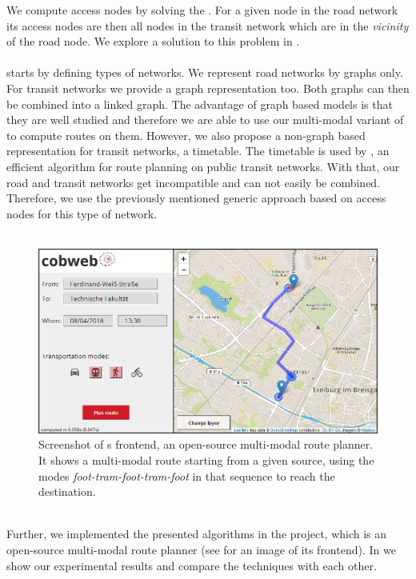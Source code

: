	We compute access nodes by solving the \nearestNeighborProblem. For a given node in the road network its access
	nodes are then all nodes in the transit network which are in the \textit{vicinity} of the road node. We explore a solution
	to this problem in .\\\\
	 starts by defining types of networks. We represent road networks by graphs only.
	For transit networks we provide a graph representation too. Both graphs can then be combined into a linked graph.
	The advantage of graph based models is that they are well studied and therefore we are able to use our
	multi-modal variant of \dijkstra to compute routes on them.
	However, we also propose a non-graph based representation for transit networks, a timetable. The timetable is used by \csa,
	an efficient algorithm for route planning on public transit networks. With that, our road and transit networks get incompatible
	and can not easily be combined. Therefore, we use the previously mentioned generic approach based on access nodes
	for this type of network.\\\\
	\begin{figure}[!ht]
		 \begin{center}
			\includegraphics[scale=0.5]{res/cobweb_frontend}
		\end{center}
		\caption{Screenshot of {\cobweb}s  frontend, an open-source multi-modal route planner. It shows a multi-modal
		route starting from a given source, using the modes \textit{foot-tram-foot-tram-foot} in that sequence to reach the destination.}
		\label{cobweb_frontend}
	\end{figure}\quad\\
	Further, we implemented the presented algorithms in the \cobweb {} project, which is an open-source multi-modal
	route planner (see  for an image of its frontend).
	In  we show our experimental results and compare the techniques with each other.